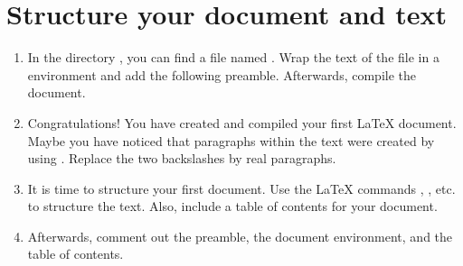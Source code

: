 \section{Structure your document and text}

\begin{enumerate}
	\item In the directory , you can find a file named . Wrap the text of the file in a  environment and add the following preamble. Afterwards, compile the document. 
	\item Congratulations! You have created and compiled your first \LaTeX{} 
	document. Maybe you have noticed that paragraphs within the text were 
	created by using . Replace the 
	two backslashes by real paragraphs.
	\item It is time to structure your first document. Use the \LaTeX{} 
	commands , 
	, etc. to structure the text. 
	Also, 
	include 
	a table of contents for your document. 
	\item Afterwards, comment out the preamble, the document environment, and the table of contents. 
\end{enumerate}

